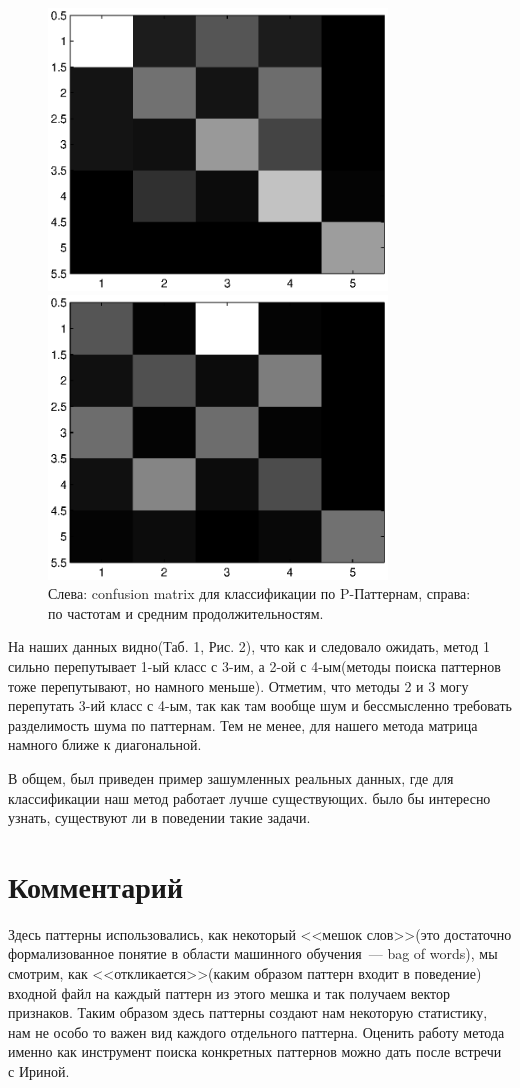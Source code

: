 \documentclass[12pt]{report}
\begin{document}
\begin{figure}[H]
\label{fig:conff}
	\begin{multicols}{2}
	\hfill
	\includegraphics[width=90mm]{confusion_Ppat.eps}

	\includegraphics[width=90mm]{confusion_freq.eps}
	\end{multicols}
	\caption{Слева: confusion matrix для классификации по P-Паттернам, справа: по частотам и средним продолжительностям.}
\label{fig:omp_tp}
\end{figure}

На наших данных видно(Таб. 1, Рис. 2), что как и следовало ожидать, метод 1
сильно перепутывает 1-ый класс с 3-им, а 2-ой с 4-ым(методы поиска паттернов тоже перепутывают, но намного меньше). 
Отметим, что методы 2 и 3 могу перепутать 3-ий класс с 4-ым,
так как там вообще шум и бессмысленно требовать разделимость шума по паттернам. Тем не менее, для
нашего метода матрица намного ближе к диагональной.

В общем, был приведен пример зашумленных реальных данных, где для классификации наш метод работает лучше существующих.
было бы интересно узнать, существуют ли в поведении такие задачи. 
\section{Комментарий}
Здесь паттерны использовались, как некоторый <<мешок слов>>(это достаточно формализованное понятие в области машинного обучения~--- bag of words), 
мы смотрим, как <<откликается>>(каким образом паттерн входит в поведение) входной файл на каждый паттерн из этого мешка и так получаем 
вектор признаков.  Таким образом здесь паттерны создают нам некоторую статистику, нам не особо то важен вид каждого отдельного паттерна.
Оценить работу метода именно как инструмент поиска конкретных паттернов можно дать после встречи с Ириной. 
\newpage
\end{document}
